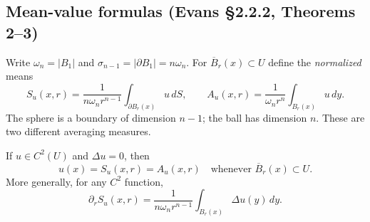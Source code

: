 \subsection{Mean-value formulas (Evans \S2.2.2, Theorems 2--3)}
\label{sec:2-elliptic-mean}
Write $\omega_n=|B_1|$ and $\sigma_{n-1}=|\partial B_1|=n\omega_n$.
For $\overline B_r(x)\subset U$ define the \emph{normalized} means
\[
 S_u(x,r)=\frac1{n\omega_n r^{n-1}}\int_{\partial B_r(x)}u\,dS,
 \qquad
 A_u(x,r)=\frac1{\omega_n r^n}\int_{B_r(x)}u\,dy.
\]
The sphere is a boundary of dimension $n-1$; the ball has dimension $n$.
These are two different averaging measures.
\Needspace{45mm}

\begin{theorem}\label{thm:2-harmonic-mean}
If $u\in C^2(U)$ and $\Delta u=0$, then
\[
 u(x)=S_u(x,r)=A_u(x,r)
 \quad\text{whenever }\overline B_r(x)\subset U.
\]
More generally, for any $C^2$ function,
\[
 \partial_r S_u(x,r)
 =\frac1{n\omega_n r^{n-1}}\int_{B_r(x)}\Delta u(y)\,dy .
 \tag{M}
\]
\end{theorem}
